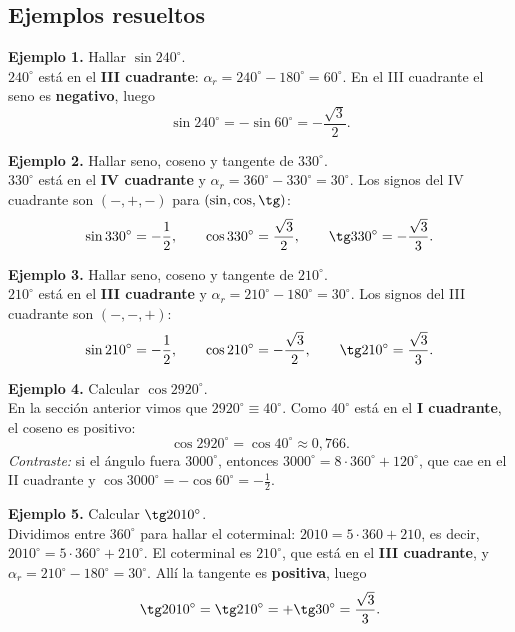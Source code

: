 \documentclass[12pt, letterpaper]{article}
\providecommand{\sen}{\sin}
\begin{document}
\subsection*{Ejemplos resueltos}

\begin{cuadrosolucion}
  \small
  \textbf{Ejemplo 1.} Hallar $\sen 240^\circ$.\\[2pt]
  $240^\circ$ está en el \textbf{III cuadrante}: $\alpha_r=240^\circ-180^\circ=60^\circ$.
  En el III cuadrante el seno es \textbf{negativo}, luego
  \[
    \sen 240^\circ=-\sen 60^\circ=-\frac{\sqrt{3}}{2}.
  \]
\end{cuadrosolucion}

\begin{cuadrosolucion}
  \small
  \textbf{Ejemplo 2.} Hallar seno, coseno y tangente de $330^\circ$.\\[2pt]
  $330^\circ$ está en el \textbf{IV cuadrante} y
  $\alpha_r=360^\circ-330^\circ=30^\circ$. Los signos del IV cuadrante son
  $(-,+,-)$ para $(\sen,\cos,\tg)$:
  \[
    \sen 330^\circ=-\frac{1}{2},\qquad
    \cos 330^\circ=\frac{\sqrt{3}}{2},\qquad
    \tg 330^\circ=-\frac{\sqrt{3}}{3}.
  \]
\end{cuadrosolucion}

\begin{cuadrosolucion}
  \small
  \textbf{Ejemplo 3.} Hallar seno, coseno y tangente de $210^\circ$.\\[2pt]
  $210^\circ$ está en el \textbf{III cuadrante} y
  $\alpha_r=210^\circ-180^\circ=30^\circ$. Los signos del III cuadrante son
  $(-,-,+)$:
  \[
    \sen 210^\circ=-\frac{1}{2},\qquad
    \cos 210^\circ=-\frac{\sqrt{3}}{2},\qquad
    \tg 210^\circ=\frac{\sqrt{3}}{3}.
  \]
\end{cuadrosolucion}

\begin{cuadrosolucion}
  \small
  \textbf{Ejemplo 4.} Calcular $\cos 2920^\circ$.\\[2pt]
  En la sección anterior vimos que $2920^\circ\equiv 40^\circ$. Como
  $40^\circ$ está en el \textbf{I cuadrante}, el coseno es positivo:
  \[
    \cos 2920^\circ=\cos 40^\circ\approx 0{,}766.
  \]
  \emph{Contraste:} si el ángulo fuera $3000^\circ$, entonces
  $3000^\circ=8\cdot360^\circ+120^\circ$, que cae en el II cuadrante y
  $\cos 3000^\circ=-\cos 60^\circ=-\tfrac12$.
\end{cuadrosolucion}

\begin{cuadrosolucion}
  \small
  \textbf{Ejemplo 5.} Calcular $\tg 2010^\circ$.\\[2pt]
  Dividimos entre $360^\circ$ para hallar el coterminal:
  $2010=5\cdot360+210$, es decir,
  $2010^\circ=5\cdot360^\circ+210^\circ$. El coterminal es $210^\circ$,
  que está en el \textbf{III cuadrante}, y
  $\alpha_r=210^\circ-180^\circ=30^\circ$. Allí la tangente es
  \textbf{positiva}, luego
  \[
    \tg 2010^\circ=\tg 210^\circ=+\tg 30^\circ=\frac{\sqrt{3}}{3}.
  \]
\end{cuadrosolucion}
\end{document}
